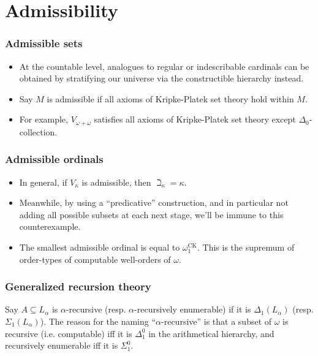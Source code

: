 \documentclass{beamer}
\begin{document}
\section{Admissibility}

\begin{frame}
\frametitle{Admissible sets}
\begin{itemize}
    \item At the countable level, analogues to regular or indescribable cardinals can be obtained by stratifying our universe via the constructible hierarchy instead.
    \item Say $M$ is admissible if all axioms of Kripke-Platek set theory hold within $M$.
    \item For example, $V_{\omega+\omega}$ satisfies all axioms of Kripke-Platek set theory except $\Delta_0$-collection.
\end{itemize}
\end{frame}

\begin{frame}
\frametitle{Admissible ordinals}
\begin{itemize}
    \item In general, if $V_\kappa$ is admissible, then $\beth_\kappa = \kappa$.
    \item Meanwhile, by using a ``predicative'' construction, and in particular not adding all possible subsets at each next stage, we'll be immune to this counterexample.
    \item The smallest admissible ordinal is equal to $\omega_1^{\mathrm{CK}}$. This is the supremum of order-types of computable well-orders of $\omega$.
\end{itemize}
\end{frame}

\begin{frame}
\frametitle{Generalized recursion theory}
Say $A \subseteq L_\alpha$ is $\alpha$-recursive (resp. $\alpha$-recursively enumerable) if it is $\Delta_1(L_\alpha)$ (resp. $\Sigma_1(L_\alpha)$). The reason for the naming ``$\alpha$-recursive'' is that a subset of $\omega$ is recursive (i.e. computable) iff it is $\Delta^0_1$ in the arithmetical hierarchy, and recursively enumerable iff it is $\Sigma^0_1$.
\end{frame}
\end{document}
